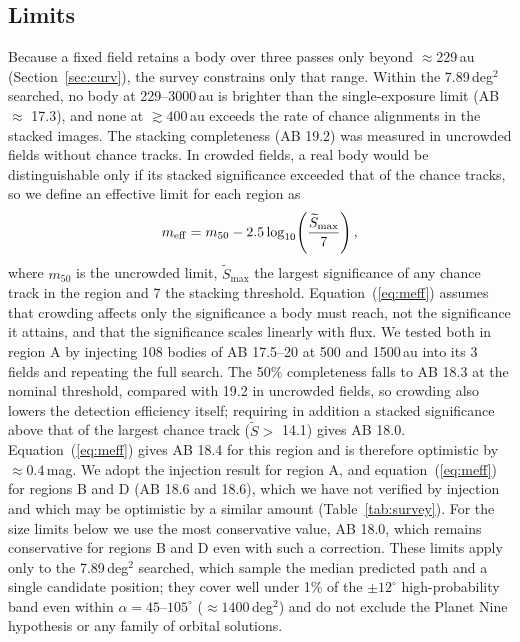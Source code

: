 \documentclass[twocolumn,linenumbers,anonymous]{aastex702}
\begin{document}
\subsection{Limits}\label{sec:limits}
Because a fixed field retains a body over three passes only beyond $\approx$229\,au (Section~\ref{sec:curv}), the survey constrains only that range. Within the 7.89\,deg$^2$ searched, no body at 229--3000\,au is brighter than the single-exposure limit (AB $\approx$ 17.3), and none at $\gtrsim 400$\,au exceeds the rate of chance alignments in the stacked images. The stacking completeness (AB 19.2) was measured in uncrowded fields without chance tracks. In crowded fields, a real body would be distinguishable only if its stacked significance exceeded that of the chance tracks, so we define an effective limit for each region as
\begin{equation}
m_{\rm eff} = m_{50} - 2.5\log_{10}\!\left(\frac{\widetilde{S}_{\max}}{7}\right),
\label{eq:meff}
\end{equation}
where $m_{50}$ is the uncrowded limit, $\widetilde{S}_{\max}$ the largest significance of any chance track in the region and 7 the stacking threshold. Equation~(\ref{eq:meff}) assumes that crowding affects only the significance a body must reach, not the significance it attains, and that the significance scales linearly with flux. We tested both in region A by injecting 108 bodies of AB 17.5--20 at 500 and 1500\,au into its 3 fields and repeating the full search. The 50\% completeness falls to AB 18.3 at the nominal threshold, compared with 19.2 in uncrowded fields, so crowding also lowers the detection efficiency itself; requiring in addition a stacked significance above that of the largest chance track ($\widetilde{S} > $ 14.1) gives AB 18.0. Equation~(\ref{eq:meff}) gives AB 18.4 for this region and is therefore optimistic by $\approx 0.4$\,mag. We adopt the injection result for region A, and equation~(\ref{eq:meff}) for regions B and D (AB 18.6 and 18.6), which we have not verified by injection and which may be optimistic by a similar amount (Table~\ref{tab:survey}). For the size limits below we use the most conservative value, AB 18.0, which remains conservative for regions B and D even with such a correction. These limits apply only to the 7.89\,deg$^2$ searched, which sample the median predicted path and a single candidate position; they cover well under 1\% of the $\pm 12^\circ$ high-probability band even within $\alpha = 45$--$105^\circ$ ($\approx 1400$\,deg$^2$) and do not exclude the Planet Nine hypothesis or any family of orbital solutions.
\end{document}
